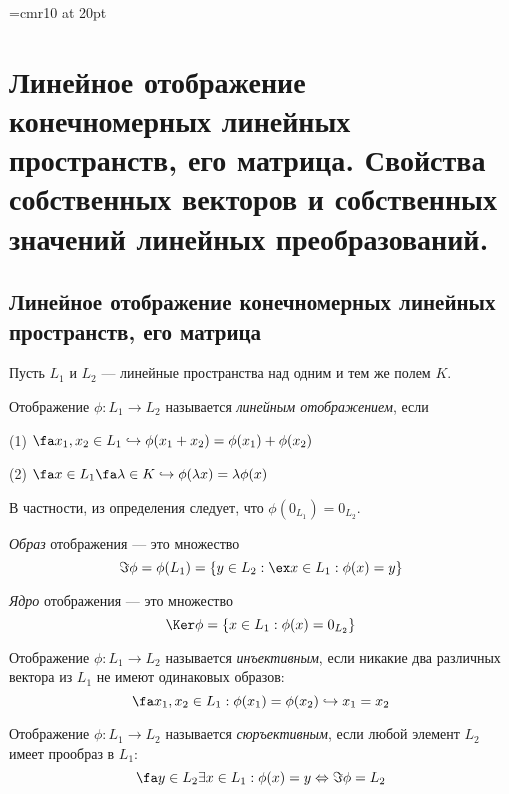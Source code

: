\font\Large=cmr10 at 20pt
\def\fudge#1{\smash{\hbox{\Large#1}}}
\chapter[Линейное отображение конечномерных линейных прост\-ранств, его матрица. Свойства собственных векторов и собственных значений линейных преобразований.]{Линейное отображение конечномерных линейных пространств, его матрица. Свойства собственных векторов и собственных значений линейных преобразований.}
\section{Линейное отображение конечномерных линейных пространств, его матрица}
  Пусть $L_1$ и $L_2$ --- линейные пространства над одним  и тем же полем $K$.
  \begin{defn}
  Отображение $\phi: L_1\rightarrow L_2$ называется \textit{линейным отображением}, если
  
  (1) $\fa x_1,x_2 \in L_1 \hookrightarrow \phi(x_1+x_2)=\phi(x_1)+\phi(x_2)$
  
  (2) $\fa x \in L_1 \fa \lambda \in K \hookrightarrow \phi(\lambda x)=\lambda \phi(x)$
  \end{defn}
  В частности, из определения следует, что $\phi(0_{L_1})=0_{L_2}$.
  \begin{defn}
    \textit{Образ} отображения --- это множество 
    \begin{equation}
    \Im\phi=\phi(L_1)=\{y\in L_2: \ex x\in L_1: \phi(x)=y\}
    \end{equation}
  \end{defn}
  \begin{defn}
    \textit{Ядро} отображения --- это множество 
    \begin{equation}
    \Ker\phi=\{x\in L_1: \phi(x)=0_{L_2}\}
    \end{equation}
  \end{defn}
  \begin{defn}
  Отображение $\phi: L_1\rightarrow L_2$ называется \textit{инъективным}, если никакие два различных вектора из $L_1$ не имеют одинаковых образов:
  \begin{equation}\label{22.1.inject}
    \fa x_1,x_2 \in L_1: \phi(x_1)=\phi(x_2) \hookrightarrow x_1=x_2
  \end{equation}
  \end{defn}  
  \begin{defn}
  Отображение $\phi: L_1\rightarrow L_2$ называется \textit{сюръективным}, если любой элемент $L_2$ имеет прообраз в $L_1$:
  \begin{equation}\label{22.1.surject}
    \fa y \in L_2 \exists x \in L_1: \phi(x)=y \Leftrightarrow \Im \phi = L_2
  \end{equation}
  \end{defn}  
  
